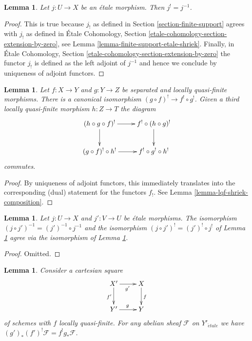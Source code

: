 \documentclass{stacks-project}
\theoremstyle{plain}
\newtheorem{lemma}[subsection]{Lemma}
\theoremstyle{definition}
\theoremstyle{remark}
\numberwithin{equation}{subsection}
\def\etale{{\acute{e}tale}}
\begin{document}
\begin{lemma}
\label{lemma-etale-upper-shriek}
Let $j : U \to X$ be an \'etale morphism. Then $j^! = j^{-1}$.
\end{lemma}

\begin{proof}
This is true because $j_!$ as defined in
Section \ref{section-finite-support}
agrees with $j_!$ as defined in \'Etale Cohomology, Section
\ref{etale-cohomology-section-extension-by-zero}, see
Lemma \ref{lemma-finite-support-etale-shriek}. Finally, in
\'Etale Cohomology, Section \ref{etale-cohomology-section-extension-by-zero}
the functor $j_!$ is defined
as the left adjoint of $j^{-1}$ and hence we conclude by
uniqueness of adjoint functors.
\end{proof}

\begin{lemma}
\label{lemma-upper-shriek-restriction}
Let $f : X \to Y$ and $g : Y \to Z$ be separated and locally quasi-finite
morphisms. There is a canonical isomorphism $(g \circ f)^! \to f^! \circ g^!$.
Given a third locally quasi-finite morphism $h : Z \to T$
the diagram
$$
\xymatrix{
(h \circ g \circ f)^! \ar[r] \ar[d] &
f^! \circ (h \circ g)^! \ar[d] \\
(g \circ f)^! \circ h^! \ar[r] & f^! \circ g^! \circ h^!
}
$$
commutes.
\end{lemma}

\begin{proof}
By uniqueness of adjoint functors, this immediately translates
into the corresponding (dual) statement for the functors $f_!$.
See Lemma \ref{lemma-lqf-shriek-composition}.
\end{proof}

\begin{lemma}
\label{lemma-upper-shriek-restriction-etale}
Let $j : U \to X$ and $j' : V \to U$ be \'etale morphisms.
The isomorphism $(j \circ j')^{-1} = (j')^{-1} \circ j^{-1}$
and the isomorphism $(j \circ j')^! = (j')^! \circ j^!$ of
Lemma \ref{lemma-upper-shriek-restriction}
agree via the isomorphism of Lemma \ref{lemma-etale-upper-shriek}.
\end{lemma}

\begin{proof}
Omitted.
\end{proof}

\begin{lemma}
\label{lemma-lqf-base-change-upper-shriek}
Consider a cartesian square
$$
\xymatrix{
X' \ar[r]_{g'} \ar[d]_{f'} & X \ar[d]^f \\
Y' \ar[r]^g & Y
}
$$
of schemes with $f$ locally quasi-finite. For any abelian sheaf $\mathcal{F}$
on $Y'_\etale$ we have $(g')_*(f')^!\mathcal{F} = f^!g_*\mathcal{F}$.
\end{lemma}
\end{document}

